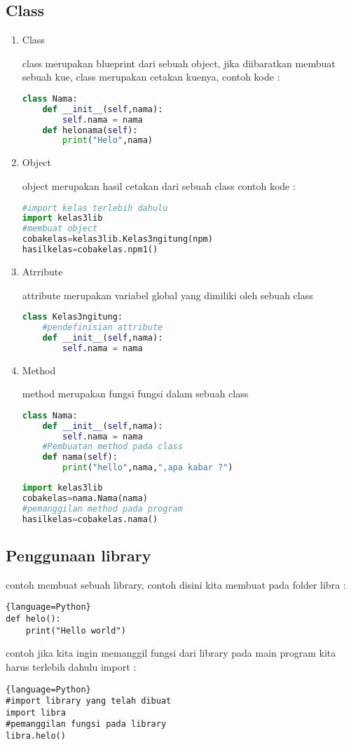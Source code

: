 \subsection{Class}
\begin{enumerate}
\item Class
\par 
class merupakan blueprint dari sebuah object, jika diibaratkan membuat sebuah kue, class merupakan cetakan kuenya, contoh kode :
\begin{lstlisting}[language=Python]
class Nama:
    def __init__(self,nama):
        self.nama = nama
    def helonama(self):
        print("Helo",nama)
\end{lstlisting}

\item Object
\par 
object merupakan hasil cetakan dari sebuah class contoh kode :
\begin{lstlisting}[language=Python]
#import kelas terlebih dahulu
import kelas3lib
#membuat object
cobakelas=kelas3lib.Kelas3ngitung(npm) 
hasilkelas=cobakelas.npm1()
\end{lstlisting}
\item Atrribute
\par 
attribute merupakan variabel global yang dimiliki oleh sebuah class
\begin{lstlisting}[language=Python]
class Kelas3ngitung:
	#pendefinisian attribute
    def __init__(self,nama):
        self.nama = nama
\end{lstlisting}
\item Method
\par 
method merupakan fungsi fungsi dalam sebuah class
\begin{lstlisting}[language=Python]
class Nama:
    def __init__(self,nama):
        self.nama = nama
    #Pembuatan method pada class
    def nama(self):
       	print("hello",nama,",apa kabar ?")
\end{lstlisting}

\begin{lstlisting}[language=Python]
import kelas3lib
cobakelas=nama.Nama(nama) 
#pemanggilan method pada program
hasilkelas=cobakelas.nama()
\end{lstlisting}
\end{enumerate}

\subsection{Penggunaan library}
\par 
contoh membuat sebuah library, contoh disini kita membuat pada folder libra :
\begin{lstlisting}{language=Python}
def helo():
    print("Hello world")
\end{lstlisting}
contoh jika kita ingin memanggil fungsi dari library pada main program kita harus terlebih dahulu import :
\begin{lstlisting}{language=Python}
#import library yang telah dibuat
import libra
#pemanggilan fungsi pada library
libra.helo()
\end{lstlisting}
